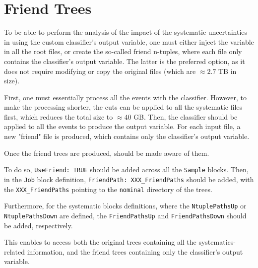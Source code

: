 \clearpage

\section{Friend Trees}
\label{appendix:friend-trees}

To be able to perform the analysis of the impact of the systematic uncertainties in \trex using the custom classifier's
output variable, one must either inject the variable in all the root files, or create the so-called friend n-tuples,
where each file only contains the classifier's output variable. The latter is the preferred option, as it does not
require modifying or copy the original files (which are $\approx 2.7$ TB in size).

First, one must essentially process all the events with the classifier. However, to make the processing shorter, the
cuts can be applied to all the systematic files first, which reduces the total size to $\approx 40$ GB. Then, the
classifier should be applied to all the events to produce the output variable. For each input file, a new "friend"
file is produced, which contains only the classifier's output variable.

Once the friend trees are produced, \trex should be made aware of them.

To do so, \texttt{UseFriend: TRUE} should be added across all the \texttt{Sample} blocks. Then, in the \texttt{Job} block
definition, \texttt{FriendPath: XXX\_FriendPaths} should be added, with the \texttt{XXX\_FriendPaths} pointing to the
\texttt{nominal} directory of the trees.

Furthermore, for the systematic blocks definitions, where the \texttt{NtuplePathsUp} or \texttt{NtuplePathsDown} are
defined, the \texttt{FriendPathsUp} and \texttt{FriendPathsDown} should be added, respectively.

This enables \trex to access both the original trees containing all the systematics-related information, and
the friend trees containing only the classifier's output variable.

\clearpage